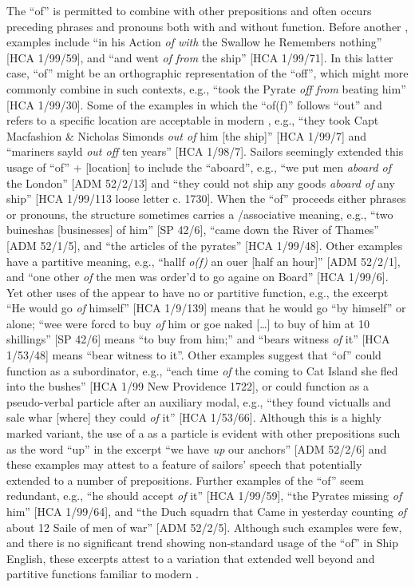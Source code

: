 The  “of” is permitted to combine with other prepositions and often occurs preceding  phrases and pronouns both with and without  function. Before another , examples include “in his Action \textit{of with} the Swallow he Remembers nothing” [HCA 1/99/59], and “and went \textit{of from} the ship” [HCA 1/99/71].  In this latter case, “of” might be an orthographic representation of the  “off”, which might more commonly combine in such contexts, e.g., “took the Pyrate \textit{off from} beating him” [HCA 1/99/30]. Some of the examples in which the  “of(f)” follows “out” and refers to a specific location are acceptable in modern , e.g., “they took Capt Macfashion \& Nicholas Simonds \textit{out of} him [the ship]” [HCA 1/99/7] and “mariners sayld \textit{out off}  ten years” [HCA 1/98/7]. Sailors seemingly extended this usage of “of” + [location] to include the  “aboard”, e.g., “we put men \textit{aboard of} the London” [ADM 52/2/13] and “they could not ship any goods \textit{aboard of} any ship” [HCA 1/99/113 loose letter c. 1730]. When the  “of” proceeds either  phrases or pronouns, the structure sometimes carries a /associative meaning, e.g., “two buineshas [businesses] of him” [SP 42/6], “came down the River of Thames” [ADM 52/1/5], and “the articles of the pyrates” [HCA 1/99/48]. Other examples have a partitive meaning, e.g., “hallf \textit{o(f)} an ouer [half an hour]” [ADM 52/2/1], and “one other \textit{of} the men was order’d to go againe on Board” [HCA 1/99/6]. Yet other uses of the  appear to have no  or partitive function, e.g., the excerpt “He would go \textit{of} himself” [HCA 1/9/139] means that he would go “by himself” or alone; “wee were forcd to buy \textit{of} him or goe naked […] to buy of him at 10 shillings” [SP 42/6] means “to buy from him;” and “bears witness \textit{of} it” [HCA 1/53/48] means “bear witness to it”. Other examples suggest that “of” could function as a subordinator, e.g., “each time \textit{of} the  coming to Cat Island she fled into the bushes” [HCA 1/99 New Providence 1722], or could function as a pseudo-verbal particle after an auxiliary modal, e.g., “they found victualls and sale whar [where] they could \textit{of} it” [HCA 1/53/66]. Although this is a highly marked variant, the use of a  as a  particle is evident with other prepositions such as the word “up” in the excerpt “we have \textit{up} our anchors” [ADM 52/2/6] and these examples may attest to a feature of sailors’ speech that potentially extended to a number of prepositions. Further examples of the  “of” seem redundant, e.g., “he should accept \textit{of} it” [HCA 1/99/59], “the Pyrates missing \textit{of} him” [HCA 1/99/64], and “the Duch squadrn that Came in yesterday counting \textit{of} about 12 Saile of men of war” [ADM 52/2/5]. Although such examples were few, and there is no significant trend showing non-standard usage of the  “of” in Ship English, these excerpts attest to a variation that extended well beyond  and partitive functions familiar to modern . 

